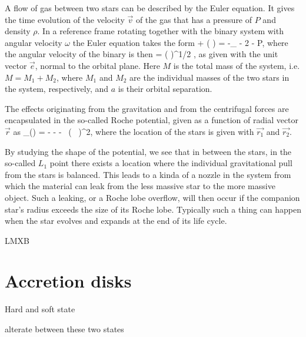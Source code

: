 A flow of gas between two stars can be described by the Euler equation.
It gives the time evolution of the velocity $\vec{v}$ of the gas that has a pressure of $P$ and density $\rho$.
In a reference frame rotating together with the binary system with angular velocity $\omega$ the Euler equation takes the form 
\be
{} + ( \cdot \nabla) = -\nabla \Phi_{} - 2 \vec{ \omega } \times {} -  \nabla P,
\ee
where the angular velocity of the binary is then
\be
\vec{ \omega } = \left(  \right)^{1/2} ,
\ee
as given with the unit vector $\vec{e}$, normal to the orbital plane.
Here $M$ is the total mass of the system, i.e. $M = M_1 + M_2$, where $M_1$ and $M_2$ are the individual masses of the two stars in the system, respectively, and $a$ is their orbital separation.

The effects originating from the gravitation and from the centrifugal forces are encapsulated in the so-called Roche potential, given as a function of radial vector $\vec{r}$ as
\be
\Phi_{}() = - - -  ( \vec{ \omega } \times {} )^2,
\ee
where the location of the stars is given with $\vec{r_1}$ and $\vec{r_2}$.

By studying the shape of the potential, we see that in between the stars, in the so-called $L_1$ point there exists a location where the individual gravitational pull from the stars is balanced.
This leads to a kinda of a nozzle in the system from which the material can leak from the less massive star to the more massive object.
Such a leaking, or a Roche lobe overflow, will then occur if the companion star's radius exceeds the size of its Roche lobe.
Typically such a thing can happen when the star evolves and expands at the end of its life cycle. 

LMXB \cite{TH06}


\section{Accretion disks}



Hard and soft state \cite{HvdK89}

alterate between these two states \cite{MDF14} \cite{DGK07}



